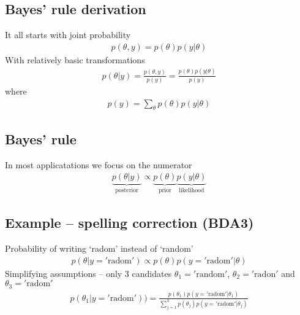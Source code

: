 \documentclass[letterpaper,10pt,english]{jupyterBook}
\begin{document}
\subsection{Bayes’ rule derivation}
\label{\detokenize{Lecture 1:bayes-rule-derivation}}
\sphinxAtStartPar
It all starts with joint probability
\begin{equation*}
\begin{split}p(\theta,y)=p(\theta)p(y|\theta)\end{split}
\end{equation*}
\sphinxAtStartPar
With relatively basic transformations
\begin{equation*}
\begin{split} p(\theta|y)=\frac{p(\theta,y)}{p(y)}=\frac{p(\theta)p(y|\theta)}{p(y)}\end{split}
\end{equation*}
\sphinxAtStartPar
where
\begin{equation*}
\begin{split}p(y)=\sum_\theta p(\theta)p(y|\theta)\end{split}
\end{equation*}

\subsection{Bayes’ rule}
\label{\detokenize{Lecture 1:bayes-rule}}
\sphinxAtStartPar
In most applicatations we focus on the numerator
\begin{equation*}
\begin{split} \underbrace{p(\theta|y)}_{\mathrm{posterior}}\propto 
\underbrace{p(\theta)}_{\mathrm{prior}}
\underbrace{p(y|\theta)}_{\mathrm{likelihood}}\end{split}
\end{equation*}
\sphinxAtStartPar
{}


\subsection{Example – spelling correction (BDA3)}
\label{\detokenize{Lecture 1:example-spelling-correction-bda3}}
\sphinxAtStartPar
Probability of writing ‘radom’ instead of ‘random’
\begin{equation*}
\begin{split}
p(\theta|y=\mathrm{'radom'})\propto p(\theta)p(y=\mathrm{'radom'}|\theta)
\end{split}
\end{equation*}
\sphinxAtStartPar
Simplifying assumptions – only 3 candidates \(\theta_1=\mathrm{'random'}\), \(\theta_2=\mathrm{'radon'}\) and \(\theta_3=\mathrm{'radom'}\)
\begin{equation*}
\begin{split}
p(\theta_1|y=\mathrm{'radom'}))= \frac{p(\theta_1)p(y=\mathrm{'radom'}|\theta_1)}{\sum_{j=1}^{3}p(\theta_j)p(y=\mathrm{'radom'}|\theta_j)}
\end{split}
\end{equation*}
\end{document}
